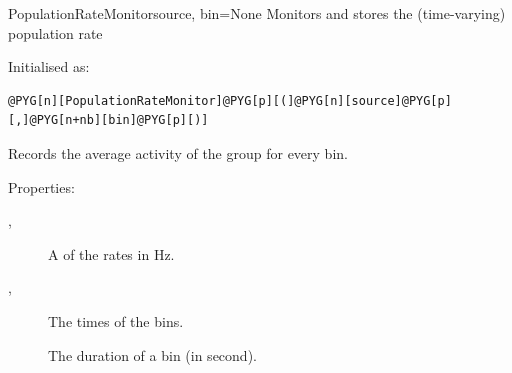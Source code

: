 \documentclass[letterpaper,10pt,english]{manual}
\begin{document}
\hypertarget{brian.PopulationRateMonitor}{}\begin{classdesc}{PopulationRateMonitor}{source, bin=None}
Monitors and stores the (time-varying) population rate

Initialised as:

\begin{Verbatim}[commandchars=@\[\]]
@PYG[n][PopulationRateMonitor]@PYG[p][(]@PYG[n][source]@PYG[p][,]@PYG[n+nb][bin]@PYG[p][)]
\end{Verbatim}

Records the average activity of the group for every bin.

Properties:
\begin{description}
\item[, ] \leavevmode
A  of the rates in Hz.

\item[, ] \leavevmode
The times of the bins.

\item[] \leavevmode
The duration of a bin (in second).

\end{description}
\end{classdesc}
\end{document}
